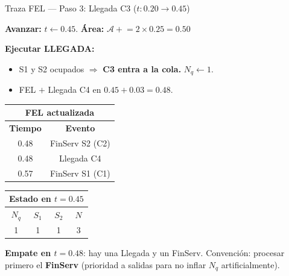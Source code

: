 \documentclass[aspectratio=1610, 9pt]{beamer}
\begin{document}
\begin{frame}{Traza FEL --- Paso 3: Llegada C3 ($t: 0.20 \to 0.45$)}

\textbf{Avanzar:} $t \leftarrow 0.45$. \quad \textbf{Área:} $\mathcal{A} \mathrel{+}= 2 \times 0.25 = 0.50$

\textbf{Ejecutar LLEGADA:}
\begin{itemize}
    \item S1 y S2 ocupados $\Rightarrow$ \textcolor{rojoclaro}{\textbf{C3 entra a la cola.}} $N_q \leftarrow 1$.
    \item \textcolor{verdeoscuro}{FEL $+$} Llegada C4 en $0.45 + 0.03 = 0.48$.
\end{itemize}

\vspace{0.15cm}
\begin{center}
\renewcommand{\arraystretch}{1.3}
\begin{tabular}{|c|c|}
\hline
\multicolumn{2}{|c|}{\cellcolor{azuloscuro!15}\textbf{FEL actualizada}} \\
\hline
\textbf{Tiempo} & \textbf{Evento} \\
\hline
\rowcolor{yellow!20} 0.48 & FinServ S2 (C2) \\
0.48 & Llegada C4 \\
0.57 & FinServ S1 (C1) \\
\hline
\end{tabular}
\hspace{1.5cm}
\begin{tabular}{|c|c|c|c|}
\hline
\multicolumn{4}{|c|}{\cellcolor{grisclaro}\textbf{Estado en $t=0.45$}} \\
\hline
$N_q$ & $S_1$ & $S_2$ & $N$ \\
\hline
\cellcolor{orange!20}1 & 1 & 1 & 3 \\
\hline
\end{tabular}
\end{center}

\small\textbf{Empate en $t=0.48$}: hay una Llegada y un FinServ. Convención: procesar primero el \textbf{FinServ} (prioridad a salidas para no inflar $N_q$ artificialmente).
\end{frame}
\end{document}
